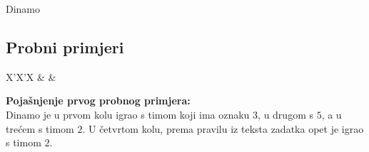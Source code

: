 \begin{statement}[
  problempoints=20,
  timelimit=1 sekunda,
  memorylimit=512 MiB,
]{Dinamo}

\subsection*{Probni primjeri}
\begin{tabularx}{\textwidth}{X'X'X}
 &
 &
\end{tabularx}

\textbf{Pojašnjenje prvog probnog primjera:} \\
Dinamo je u prvom kolu igrao s timom koji ima oznaku $3$, u drugom s $5$, a u
trećem s timom $2$. U četvrtom kolu, prema pravilu iz teksta zadatka opet
je igrao s timom $2$.

\end{statement}


